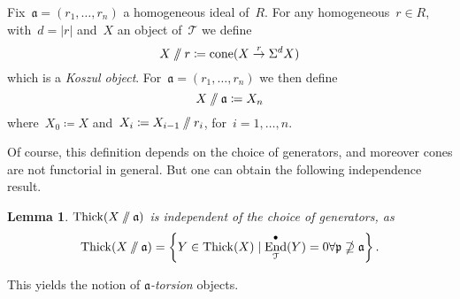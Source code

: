 \documentclass[10pt,a4paper]{article}
\theoremstyle{lecture}
\newtheorem{lemma}[theorem]{Lemma}
\newcommand\dash{\nobreakdash-\hspace{0pt}}
\newcommand\sslash{\mathbin{/\mkern-6mu/}}
\DeclareMathOperator\cone{cone}
\DeclareMathOperator\End{End}
\DeclareMathOperator\Thick{Thick}
\begin{document}
Fix~$\mathfrak{a}=(r_1,\dotsc,r_n)$ a homogeneous ideal of~$R$. For any homogeneous~$r\in R$, with~$d=|r|$ and~$X$ an object of~$\mathcal{T}$ we define
\begin{equation}
  X\sslash r\coloneqq\cone(X\overset{r}\to\Sigma^dX)
\end{equation}
which is a \emph{Koszul object}. For~$\mathfrak{a}=(r_1,\dotsc,r_n)$ we then define
\begin{equation}
  X\sslash\mathfrak{a}\coloneqq X_n
\end{equation}
where~$X_0\coloneqq X$ and~$X_i\coloneqq X_{i-1}\sslash r_i$, for~$i=1,\dotsc,n$.

Of course, this definition depends on the choice of generators, and moreover cones are not functorial in general. But one can obtain the following independence result.
\begin{lemma}
  $\Thick(X\sslash{\mathfrak{a}})$ is independent of the choice of generators, as
  \begin{equation}
    \Thick(X\sslash\mathfrak{a})=\left\{ Y\in\Thick(X)\mid\End_{\mathcal{T}}^\bullet(Y)=0\forall\mathfrak{p}\nsupseteq\mathfrak{a} \right\}.
  \end{equation}
\end{lemma}
This yields the notion of \emph{$\mathfrak{a}$\dash torsion} objects.
\end{document}
